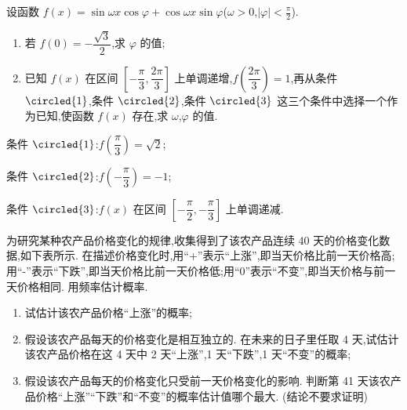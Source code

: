 \begin{problem}
设函数 \(f(x)=\sin \omega x\cos \varphi+\cos \omega x\sin \varphi\)(\(\omega>0\),\(|\varphi|<\frac{\pi}{2}\)).

\begin{enumerate}
\item 若 \(f(0)=-\dfrac{\sqrt{3}}{2}\),求 \(\varphi\) 的值;
\item 已知 \(f(x)\) 在区间 \(\left[-\dfrac{\pi}{3},\dfrac{2\pi}{3}\right]\) 上单调递增,\(f\left(\dfrac{2\pi}{3}\right)=1\),再从条件 \(\circled{1}\),条件 \(\circled{2}\),条件 \(\circled{3}\) 这三个条件中选择一个作为已知,使函数 \(f(x)\) 存在,求 \(\omega\),\(\varphi\) 的值.
\end{enumerate}

条件 \(\circled{1}\):\(f\left(\dfrac{\pi}{3}\right)=\sqrt{2}\);

条件 \(\circled{2}\):\(f\left(-\dfrac{\pi}{3}\right)=-1\);

条件 \(\circled{3}\):\(f(x)\) 在区间 \(\left[-\dfrac{\pi}{2},-\dfrac{\pi}{3}\right]\) 上单调递减.
\end{problem}

\begin{problem}
为研究某种农产品价格变化的规律,收集得到了该农产品连续 40 天的价格变化数据,如下表所示. 在描述价格变化时,用``+''表示``上涨'',即当天价格比前一天价格高;用``-''表示``下跌'',即当天价格比前一天价格低;用``0''表示``不变'',即当天价格与前一天价格相同. 用频率估计概率.

\begin{center}
\end{center}

\begin{enumerate}
\item 试估计该农产品价格``上涨''的概率;
\item 假设该农产品每天的价格变化是相互独立的. 在未来的日子里任取 4 天,试估计该农产品价格在这 4 天中 2 天``上涨'',1 天``下跌'',1 天``不变''的概率;
\item 假设该农产品每天的价格变化只受前一天价格变化的影响. 判断第 41 天该农产品价格``上涨''``下跌''和``不变''的概率估计值哪个最大. (结论不要求证明)
\end{enumerate}
\end{problem}

